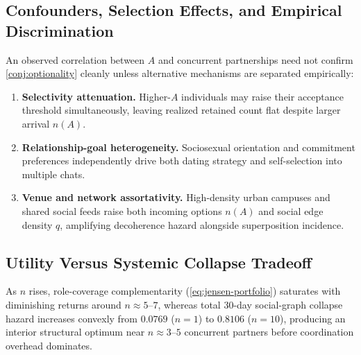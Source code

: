 \subsection{Confounders, Selection Effects, and Empirical Discrimination}
\label{subsec:conj-design}

\noindent\layerempiric{} \layerbehav{} An observed correlation between $A$ and concurrent
partnerships need not confirm \cref{conj:optionality} cleanly unless alternative mechanisms
are separated empirically:
\begin{enumerate}[nosep]
  \item \textbf{Selectivity attenuation.} Higher-$A$ individuals may raise their acceptance
        threshold simultaneously, leaving realized retained count flat despite larger arrival $n(A)$.
  \item \textbf{Relationship-goal heterogeneity.} Sociosexual orientation and commitment
        preferences independently drive both dating strategy and self-selection into multiple chats.
  \item \textbf{Venue and network assortativity.} High-density urban campuses and shared
        social feeds raise both incoming options $n(A)$ and social edge density $q$, amplifying
        decoherence hazard alongside superposition incidence.
\end{enumerate}

\subsection{Utility Versus Systemic Collapse Tradeoff}
\label{subsec:conj-tradeoff}

\noindent\layerbehav{} As $n$ rises, role-coverage complementarity
(\cref{eq:jensen-portfolio}) saturates with diminishing returns around $n \approx 5$--$7$,
whereas total 30-day social-graph collapse hazard increases convexly from $0.0769$ ($n = 1$)
to $0.8106$ ($n = 10$), producing an interior structural optimum near $n \approx 3$--$5$
concurrent partners before coordination overhead dominates.
